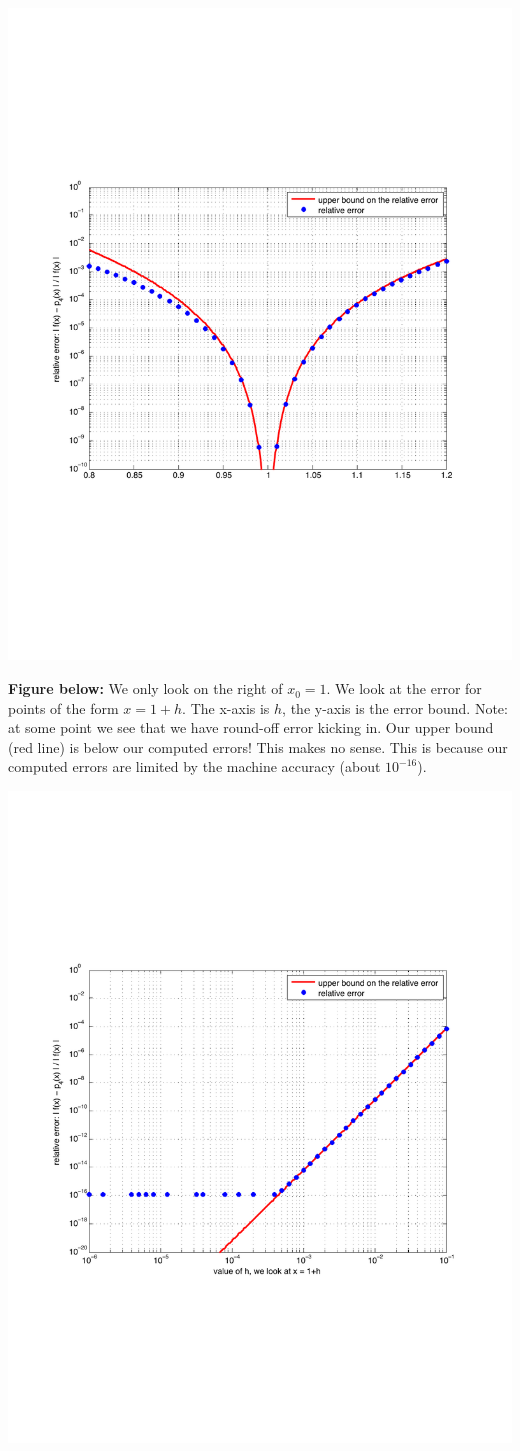\documentclass[pdftex,11pt]{article}
\begin{document}
\includegraphics[width=.7\textwidth]{sauer-exercise-0-5-6/EX_0_5_6_fig2}

\textbf{Figure below:} We only look on the right of $x_0=1$. We look at the
error for points of the form $x=1+h$.  The x-axis is $h$, the y-axis is the
error bound. Note: at some point we see that we have round-off error kicking
in.  Our upper bound (red line) is below our computed errors! This makes no
sense. This is because our computed errors are limited by the machine accuracy
(about $10^{-16}$).

\includegraphics[width=.7\textwidth]{sauer-exercise-0-5-6/EX_0_5_6_fig3}
\end{document}
